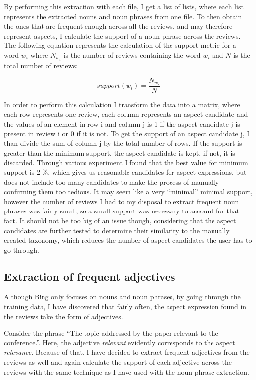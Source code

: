 By performing this extraction with each file, I get a list of lists, where each list represents the extracted nouns and noun phrases from one file. To then obtain the ones that are frequent enough across all the reviews, and may therefore represent aspects, I calculate the support of a noun phrase across the reviews. The following equation represents the calculation of the support metric for a word $w_{i}$ where $N_{w_{i}}$ is the number of reviews containing the word $w_{i}$ and $N$ is the total number of reviews:


$$support(w_{i})=\frac{N_{w_{i}}}{N}$$

In order to perform this calculation I transform the data into a matrix, where each row represents one review, each column represents an aspect candidate and the values of an element in row-i and column-j is 1 if the aspect candidate j is present in review i or 0 if it is not. To get the support of an aspect candidate j, I than divide the sum of column-j by the total number of rows. If the support is greater than the minimum support, the aspect candidate is kept, if not, it is discarded. Through various experiment I found that the best value for minimum support is 2 \%, which gives us reasonable candidates for aspect expressions, but does not include too many candidates to make the process of manually confirming them too tedious. It may seem like a very ``minimal'' minimal support, however the number of reviews I had to my disposal to extract frequent noun phrases was fairly small, so a small support was necessary to account for that fact. It should not be too big of an issue though, considering that the aspect candidates are further tested to determine their similarity to the manually created taxonomy, which reduces the number of aspect candidates the user has to go through.

\subsection{Extraction of frequent adjectives}
Although Bing only focuses on nouns and noun phrases, by going through the training data, I have discovered that fairly often, the aspect expression found in the reviews take the form of adjectives. 

Consider the phrase ``The topic addressed by the paper relevant to the conference.''. Here, the adjective \textit{relevant} evidently corresponds to the aspect \textit{relevance}. Because of that, I have decided to extract frequent adjectives from the reviews as well and again calculate the support of each adjective across the reviews with the same technique as I have used with the noun phrase extraction. 
